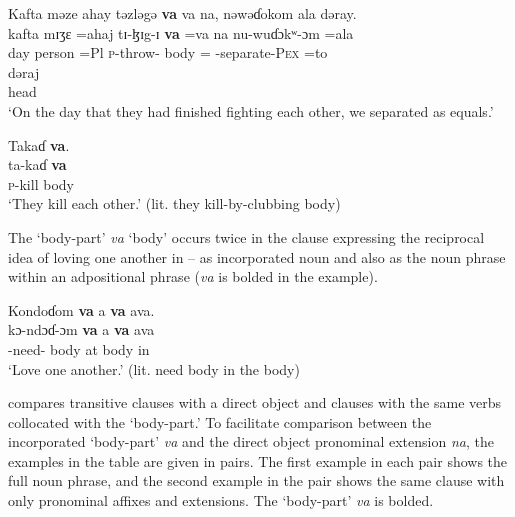 \ea \label{ex:9:59}
Kafta  məze  ahay  təzləgə  \textbf{va}  va  na,  nəwəɗokom  ala  dəray.\\
\gll  kafta  mɪʒɛ  =ahaj  tɪ-ɮɪg-ɪ    \textbf{va}  =va  na  nu-wuɗɔkʷ{}-ɔm     =ala\\  
      day       person  =Pl  \textsc{p}-throw-{\CL}      body  ={\PRF}  {\PSP}  {\oneP}-separate-\textsc{Pex} =to \\ 
      
      \medskip
\gll dəraj\\
     head\\
\glt  ‘On the day that they had finished fighting each other, we separated as equals.’
\z

\ea \label{ex:9:60}
Takaɗ  \textbf{va}.\\
\gll  ta-kaɗ   \textbf{va}\\
      \textsc{p}-kill  body\\
\glt  ‘They kill each other.’ (lit. they kill-by-clubbing body)
\z

The ‘body-part’ \textit{va} ‘body’ occurs twice in the clause expressing the reciprocal idea of loving one another in  -- as incorporated noun and also as the noun phrase within an adpositional phrase (\textit{va} is bolded in the example).

\ea \label{ex:9:61}
Kondoɗom  \textbf{va}  a  \textbf{va}  ava.\\
\gll  kɔ-ndɔɗ-ɔm    \textbf{va}  a  \textbf{va}  ava\\
      {\twoP}-need-{\twoP}    body  at  body  in\\
\glt  ‘Love one another.’ (lit. need body in the body)
\z

 compares transitive clauses with a direct object and clauses with the same verbs collocated with the ‘body-part.’ To facilitate comparison between the incorporated ‘body-part’ \textit{va}  and the direct object pronominal extension \textit{na}, the examples in the table are given in pairs. The first example in each pair shows the full noun phrase, and the second example in the pair shows the same clause with only pronominal affixes and extensions. The ‘body-part’ \textit{va} is bolded.

